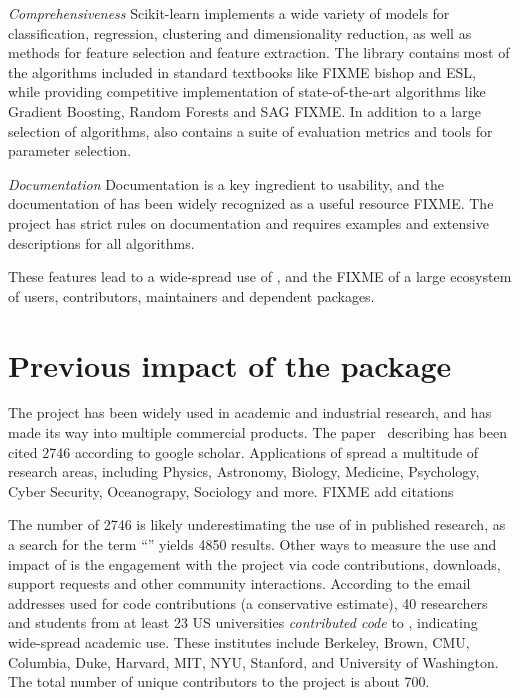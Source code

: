 \emph{Comprehensiveness} Scikit-learn implements a wide variety of models for classification,
regression, clustering and dimensionality reduction, as well as methods for feature
selection and feature extraction. The library contains most of the algorithms included
in standard textbooks like FIXME bishop and ESL, while providing competitive implementation
of state-of-the-art algorithms like Gradient Boosting, Random Forests and SAG FIXME\@.
In addition to a large selection of algorithms, \sklearn{} also contains a suite
of evaluation metrics and tools for parameter selection.

\emph{Documentation}
Documentation is a key ingredient to usability, and the documentation of \sklearn{}
has been widely recognized as a useful resource FIXME\@. The \sklearn{} project
has strict rules on documentation and requires examples and extensive descriptions
for all algorithms.

These features lead to a wide-spread use of \sklearn{}, and the FIXME of a large
ecosystem of users, contributors, maintainers and dependent packages.

\section{Previous impact of the \sklearn{} package}
The \sklearn{} project has been widely used in academic and industrial research,
and has made its way into multiple commercial products. The
paper~\autocite{pedregosa2011scikit} describing \sklearn{} has been cited 2746
according to google scholar. Applications of \sklearn{} spread
a multitude of research areas, including Physics, Astronomy,
Biology, Medicine, Psychology, Cyber Security, Oceanograpy, Sociology and more. FIXME add citations

The number of 2746 is likely underestimating the use of \sklearn{} in published research, as a search for the
term ``\sklearn{}'' yields 4850 results.
Other ways to measure the use and impact of \sklearn{} is the engagement with
the project via code contributions, downloads, support requests and other
community interactions.
According to the email addresses used for code contributions (a conservative
estimate), 40 researchers and students from at least 23 US universities
\emph{contributed code} to \sklearn{}, indicating wide-spread academic use.
These institutes include Berkeley, Brown, CMU, Columbia, Duke, Harvard, MIT,
NYU, Stanford, and University of Washington.
The total number of unique contributors to the project is about 700.

